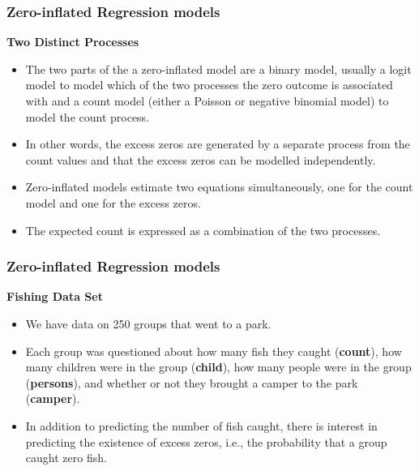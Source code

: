 \documentclass[MASTER.tex]{subfiles}
\begin{document}
\begin{frame}[fragile]
	\frametitle{Zero-inflated Regression models}
	\large
	\textbf{Two Distinct Processes}
	\begin{itemize}
		\item The two parts of the a zero-inflated model are a binary model, usually a logit model to model which of the two processes the zero outcome is associated with and a count model (either a Poisson or negative binomial model) to model the count process. 
		\item In other words, the excess zeros are generated by a separate process from the count values and that the excess zeros can be modelled independently. 
		\item Zero-inflated models estimate two equations simultaneously, one for the count model and one for the excess zeros.
\item The expected count is expressed as a combination of the two processes.
		
	\end{itemize}
\end{frame}
\begin{frame}[fragile]
	\frametitle{Zero-inflated Regression models}
	\Large
	\textbf{Fishing Data Set}
	\begin{itemize}
		\item We have data on 250 groups that went to a park. 
		\item Each group was questioned about how many fish they caught (\textbf{count}), how many children were in the group (\textbf{child}), how many people were in the group (\textbf{persons}), and whether or not they brought a camper to the park (\textbf{camper}).
		\item 
		In addition to predicting the number of fish caught, there is interest in predicting the existence of excess zeros, i.e., the probability that a group caught zero fish. 
	
	\end{itemize}
\end{frame}
\end{document}
